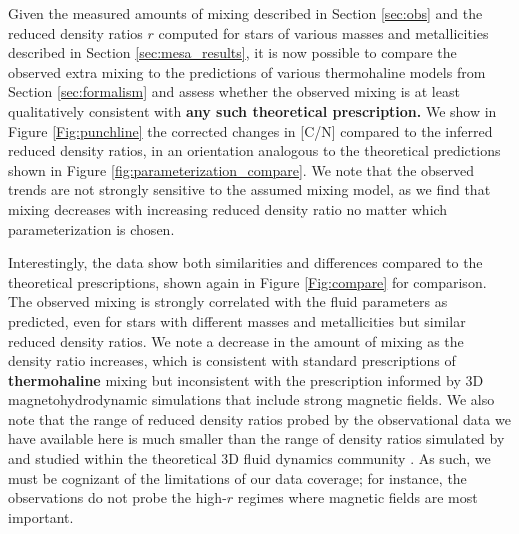 

Given the measured amounts of mixing described in Section \ref{sec:obs} and the reduced density ratios $r$ computed for stars of various masses and metallicities described in Section \ref{sec:mesa_results}, it is now possible to compare the observed %
extra mixing to the predictions of various thermohaline models from Section \ref{sec:formalism} and assess whether the observed mixing is at least qualitatively consistent with \textbf{any such theoretical prescription.}
%
We show in Figure \ref{Fig:punchline} the corrected changes in [C/N] compared to the inferred reduced density ratios, in an orientation analogous to the theoretical predictions shown in Figure \ref{fig:parameterization_compare}. We note that the observed trends are not strongly sensitive to the assumed mixing model, {as we find that mixing decreases with increasing reduced density ratio} no matter which parameterization is chosen. 


Interestingly, the data show both similarities and differences compared to the theoretical prescriptions, shown again in Figure \ref{Fig:compare} for comparison. The observed mixing is strongly correlated with the fluid parameters as predicted, even for stars with different masses and metallicities but similar reduced density ratios. %
We note a decrease in the amount of mixing as the density ratio increases, which is %
consistent with standard prescriptions of \textbf{thermohaline} mixing but inconsistent with the prescription informed by 3D magnetohydrodynamic %
simulations that include strong magnetic fields. We also note that the range of reduced density ratios probed by the observational data we have available here is much smaller than the range of density ratios simulated by and studied within the theoretical 3D fluid dynamics community . As such, we must be cognizant of the limitations of our data coverage; for instance, the observations do not probe the high-$r$ regimes where magnetic fields are most important. %

